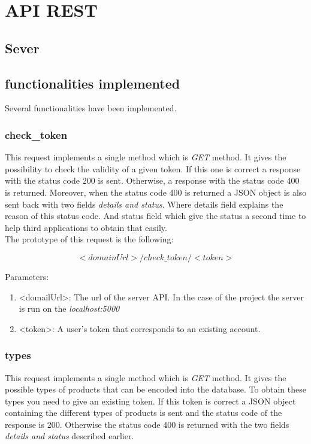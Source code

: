 \section{API REST}
\subsection{Sever}
\subsection{functionalities implemented}
Several functionalities have been implemented.
\subsubsection{check\_token}
This request implements a single method which is \textit{GET} method. It gives the possibility to check the validity of a given token. If this one is correct a response with the status code 200 is sent. Otherwise, a response with the status code 400 is returned. Moreover, when the status code 400 is returned a JSON object is also sent back with two fields \textit{details and status}. Where details field explains the reason of this status code. And status field which give the status a second time to help third applications to obtain that easily. \\

The prototype of this request is the following:

$$<domainUrl>/check\_token/<token>$$

Parameters:
\begin{enumerate}
\item <domailUrl>: The url of the server API. In the case of the project the server is run on the \textit{localhost:5000}
\item <token>: A user's token that corresponds to an existing account.
\end{enumerate}

\subsubsection{types}
This request implements a single method which is \textit{GET} method. It gives the possible types of products that can be encoded into the database. To obtain these types you need to give an existing token. If this token is correct a JSON object containing the different types of products is sent and the status code of the response is 200. Otherwise the status code 400 is returned with the two fields \textit{details and status} described earlier.\\

